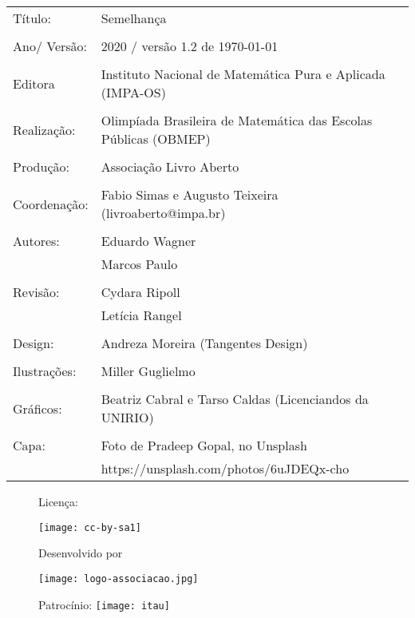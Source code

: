 \begin{tabular}{p{}p{}}
Título: & Semelhança\\
\\
Ano/ Versão: & 2020 / versão 1.2 de \today\\
\\
Editora & Instituto Nacional de Matem\'atica Pura e Aplicada (IMPA-OS)\\
\\
Realização:& Olimp\'iada Brasileira de Matem\'atica das Escolas P\'ublicas (OBMEP)\\
\\
Produção: & Associação Livro Aberto\\
\\
Coordenação: & Fabio Simas e Augusto Teixeira (livroaberto@impa.br)\\
\\
Autores:  & Eduardo Wagner\\
          & Marcos Paulo \\

\\
Revisão: &  Cydara Ripoll  \\
          &  Letícia Rangel \\
\\
Design: & Andreza Moreira (Tangentes Design) \\
\\
  Ilustrações: & Miller  Guglielmo \\ 
\\
Gráficos: & Beatriz Cabral e Tarso Caldas (Licenciandos da UNIRIO)\\
\\
  Capa: & Foto de Pradeep Gopal, no Unsplash \\
        & https://unsplash.com/photos/6uJDEQx-cho \\

\end{tabular}

\begin{figure}[b]
\begin{minipage}[l]{5cm}
\centering

{\large Licença:}

  \texttt{[image: cc-by-sa1]}
\end{minipage}\hfill
\begin{minipage}[c]{5cm}
\centering
{\large Desenvolvido por}

\texttt{[image: logo-associacao.jpg]}
\end{minipage}
\begin{minipage}[r]{5cm}
\centering

{\large Patrocínio:}
  \vspace{1em}
  \texttt{[image: itau]}
\end{minipage}
\end{figure}

